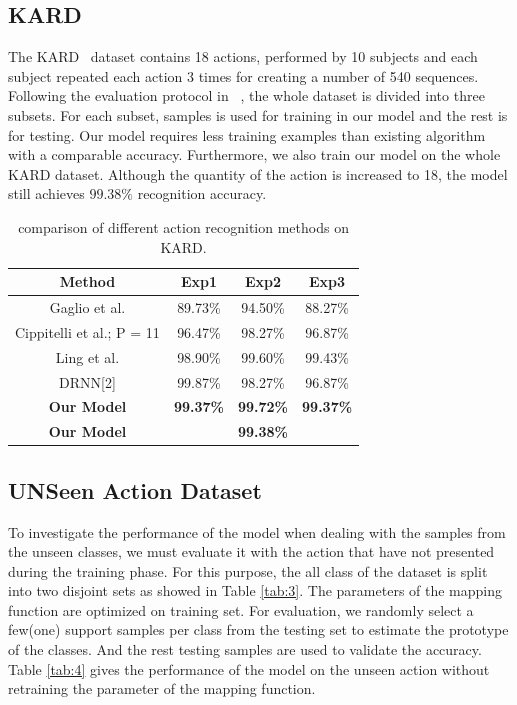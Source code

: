 \documentclass{bmvc2k}
\begin{document}
\subsection*{KARD}
The KARD~\cite{gaglio2015human} dataset contains 18 actions, performed by 10 subjects and each subject repeated each action 3 times for creating a number of 540 sequences. Following the evaluation protocol in ~\cite{pham2017learning}, the whole dataset is divided into three subsets. For each subset,  samples is used for training in our model and the rest is for testing. Our model requires less training examples than existing algorithm with a comparable accuracy. Furthermore, we also train our model on the whole KARD dataset. Although the quantity of the action is increased to 18, the model still achieves $99.38\%$ recognition accuracy.

\begin{table}[htb]
	\begin{center}
		\scalebox{1.1}
		{
			\begin{tabular}{|c|c|c|c|}
				\hline
				Method & Exp1 & Exp2 & Exp3 \\
				\hline\hline
				Gaglio et al. & 89.73\% & 94.50\%&88.27\%\\
				Cippitelli et al.; P = 11 & 96.47\% & 98.27\% & 96.87\%\\
				Ling et al. & 98.90\% & 99.60\% & 99.43\%\\
				DRNN[2] & 99.87\% & 98.27\% & 96.87\%\\
				\textbf{Our Model} & \textbf{99.37\%} & \textbf{99.72\%} & \textbf{99.37\%} \\
				\hline
				\textbf{Our Model} &  \multicolumn{3}{|c|}{\textbf{99.38\%}}\\
				\hline
			\end{tabular}
		}
	\end{center}
	\caption{ comparison of different action recognition methods on KARD. }
	\label{tab:2}
\end{table}

\subsection*{UNSeen Action Dataset}
To investigate the performance of the model when dealing with the samples from the unseen classes, we must evaluate it with the action that have not presented during the training phase. For this purpose, the all class of the dataset is split into two disjoint sets as showed in Table \ref{tab:3}. The parameters of the mapping function are optimized on training set. For evaluation, we randomly select a few(one) support samples per class from the testing set to estimate the prototype of the classes. And the rest testing samples are used to validate the accuracy. Table \ref{tab:4} gives the performance of the model on the unseen action without retraining the parameter of the mapping function. 
\end{document}
